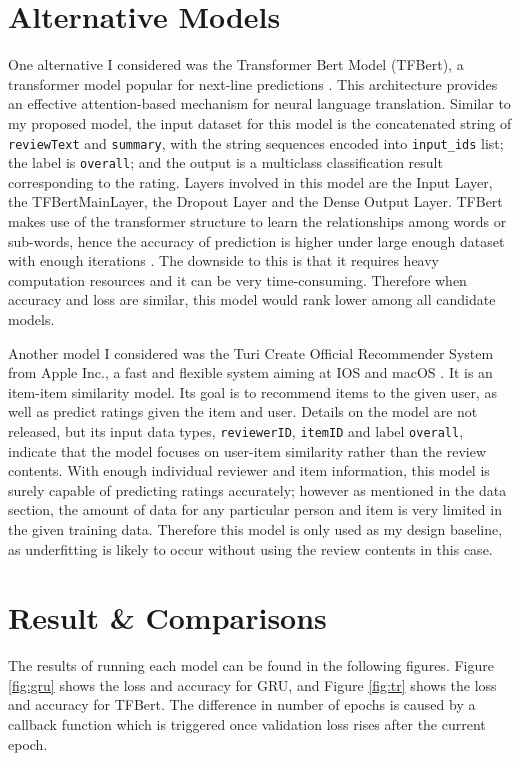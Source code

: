 \documentclass[12pt]{article}
\begin{document}
\section{Alternative Models}
\vspace{-0.3cm}
One alternative I considered was the Transformer Bert Model (TFBert), a transformer model popular for next-line predictions \cite{BERT, trans}. This architecture provides an effective attention-based mechanism for neural language translation. Similar to my proposed model, the input dataset for this model is the concatenated string of \texttt{reviewText} and \texttt{summary}, with the string sequences encoded into \texttt{input\_ids} list; the label is \texttt{overall}; and the output is a multiclass classification result corresponding to the rating. Layers involved in this model are the Input Layer, the TFBertMainLayer, the Dropout Layer and the Dense Output Layer. TFBert makes use of the transformer structure to learn the relationships among words or sub-words, hence the accuracy of prediction is higher under large enough dataset with enough iterations \cite{BERTpros}. The downside to this is that it requires heavy computation resources and it can be very time-consuming. Therefore when accuracy and loss are similar, this model would rank lower among all candidate models. 

Another model I considered was the Turi Create Official Recommender System from Apple Inc.,  a fast and flexible system aiming at IOS and macOS \cite{graph}. It is an item-item similarity model. Its goal is to recommend items to the given user, as well as predict ratings given the item and user. Details on the model are not released, but its input data types, \texttt{reviewerID}, \texttt{itemID} and label \texttt{overall}, indicate that the model focuses on user-item similarity rather than the review contents. With enough individual reviewer and item information, this model is surely capable of predicting ratings accurately; however as mentioned in the data section, the amount of data for any particular person and item is very limited in the given training data. Therefore this model is only used as my design baseline, as underfitting is likely to occur without using the review contents in this case.

\section{Result \& Comparisons}
\vspace{-0.3cm}
The results of running each model can be found in the following figures. Figure \ref{fig:gru} shows the loss and accuracy for GRU, and Figure \ref{fig:tr} shows the loss and accuracy for TFBert. The difference in number of epochs is caused by a callback function which is triggered once validation loss rises after the current epoch.
\end{document}
